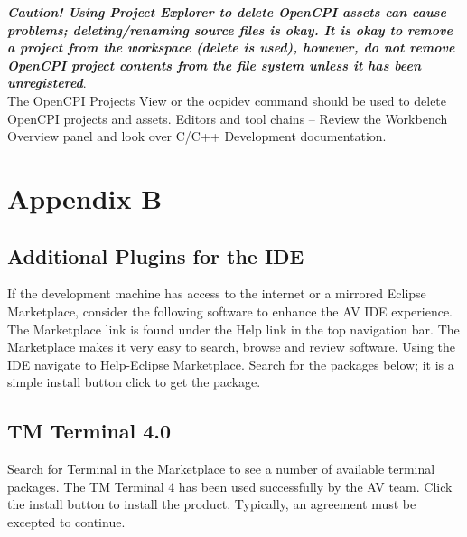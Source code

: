 \documentclass[10pt, a4paper, oneside]{article}
\begin{document}
\textbf{\emph{Caution! Using Project Explorer to delete OpenCPI assets can cause problems; deleting/renaming source files is okay. It is okay to remove a project from the workspace (delete is used), however, do not remove OpenCPI project contents from the file system unless it has been unregistered}}. \\

The OpenCPI Projects View or the ocpidev command should be used to delete OpenCPI projects and assets. Editors and tool chains – Review the Workbench Overview panel and look over C/C++ Development documentation.
\newpage
\section{Appendix B}
\subsection{Additional Plugins for the IDE}
If the development machine has access to the internet or a mirrored Eclipse Marketplace, consider the following software to enhance the AV IDE experience. The Marketplace link is found under the Help link in the top navigation bar. The Marketplace makes it very easy to search, browse and review software. Using the IDE navigate to Help-Eclipse Marketplace. Search for the packages below; it is a simple install button click to get the package.\\
\subsection{TM Terminal 4.0}
Search for Terminal in the Marketplace to see a number of available terminal packages. The TM Terminal 4 has been used successfully by the AV team. Click the install button to install the product. Typically, an agreement must be excepted to continue.\\
\end{document}

